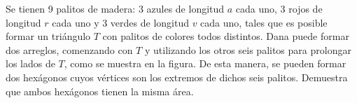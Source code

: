 Se tienen 9 palitos de madera: 3 azules de longitud $a$ cada uno, 3 rojos de longitud $r$ cada uno y 3 verdes de longitud $v$ cada uno, tales que es posible formar un triángulo $T$ con palitos de colores todos distintos. Dana puede formar dos arreglos, comenzando con $T$ y utilizando los otros seis palitos para prolongar los lados de $T$, como se muestra en la figura. De esta manera, se pueden formar dos hexágonos cuyos vértices son los extremos de dichos seis palitos. Demuestra que ambos hexágonos tienen la misma área.